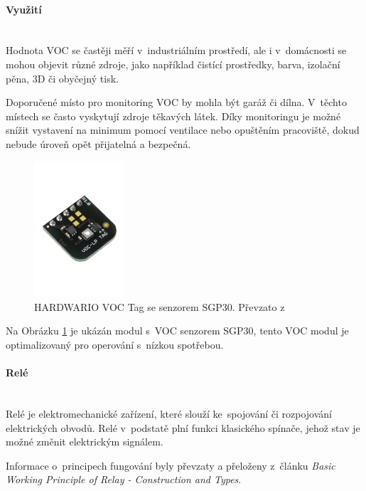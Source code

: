 \paragraph*{Využití}\mbox{} \\
Hodnota VOC se častěji měří v~industriálním prostředí, ale i v~domácnosti se mohou objevit různé zdroje, jako například čistící prostředky, barva, izolační pěna, 3D či obyčejný tisk.

Doporučené místo pro monitoring VOC by mohla být garáž či dílna. V~těchto místech se často vyskytují zdroje těkavých látek. Díky monitoringu je možné snížit vystavení na minimum pomocí ventilace nebo opuštěním pracoviště, dokud nebude úroveň opět přijatelná a bezpečná.

\begin{figure}[H]
  \centering
  \includegraphics[width=0.3\textwidth]{obrazky-figures/hardwareComponents/vocTag.jpg}
  \caption{HARDWARIO VOC Tag se senzorem SGP30. Převzato z~\cite{hardwario-module-overview}}
  \label{hardwarioVOCModule}
\end{figure}

Na Obrázku \ref{hardwarioVOCModule} je ukázán modul s~VOC senzorem SGP30, tento VOC modul je optimalizovaný pro operování s~nízkou spotřebou.

\paragraph*{Relé}\mbox{} \\
Relé je elektromechanické zařízení, které slouží ke~spojování či rozpojování elektrických obvodů. Relé v~podstatě plní funkci klasického spínače, jehož stav je možné změnit elektrickým signálem.

Informace o~principech fungování byly převzaty a přeloženy z~článku \emph{Basic Working Principle of Relay - Construction and Types}\cite{relay-information}.

